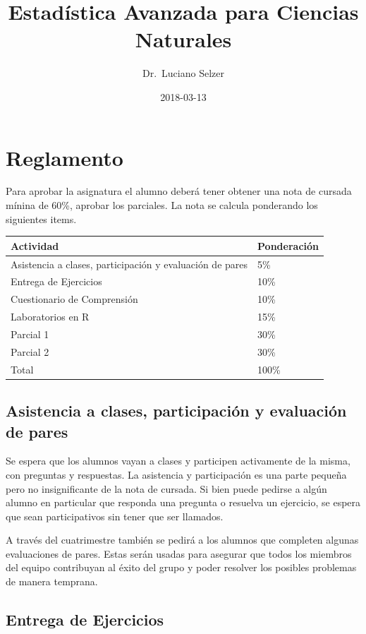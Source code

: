 \documentclass[]{book}
\title{Estadística Avanzada para Ciencias Naturales}
\author{Dr.~Luciano Selzer}
\date{2018-03-13}
\theoremstyle{definition}
\theoremstyle{definition}
\theoremstyle{definition}
\theoremstyle{remark}
\begin{document}
\maketitle

{
\setcounter{tocdepth}{1}
\tableofcontents
}
\hypertarget{reglamento}{%
\chapter{Reglamento}\label{reglamento}}

Para aprobar la asignatura el alumno deberá tener obtener una nota de
cursada mínina de 60\%, aprobar los parciales. La nota se calcula
ponderando los siguientes items.

\begin{longtable}[]{@{}ll@{}}
\toprule
Actividad & Ponderación\tabularnewline
\midrule
\endhead
Asistencia a clases, participación y evaluación de pares &
5\%\tabularnewline
Entrega de Ejercicios & 10\%\tabularnewline
Cuestionario de Comprensión & 10\%\tabularnewline
Laboratorios en R & 15\%\tabularnewline
Parcial 1 & 30\%\tabularnewline
Parcial 2 & 30\%\tabularnewline
Total & 100\%\tabularnewline
\bottomrule
\end{longtable}

\hypertarget{asistencia-a-clases-participacion-y-evaluacion-de-pares}{%
\section{Asistencia a clases, participación y evaluación de
pares}\label{asistencia-a-clases-participacion-y-evaluacion-de-pares}}

Se espera que los alumnos vayan a clases y participen activamente de la
misma, con preguntas y respuestas. La asistencia y participación es una
parte pequeña pero no insignificante de la nota de cursada. Si bien
puede pedirse a algún alumno en particular que responda una pregunta o
resuelva un ejercicio, se espera que sean participativos sin tener que
ser llamados.

A través del cuatrimestre también se pedirá a los alumnos que completen
algunas evaluaciones de pares. Estas serán usadas para asegurar que
todos los miembros del equipo contribuyan al éxito del grupo y poder
resolver los posibles problemas de manera temprana.

\hypertarget{entrega-de-ejercicios}{%
\section{Entrega de Ejercicios}\label{entrega-de-ejercicios}}
\end{document}
